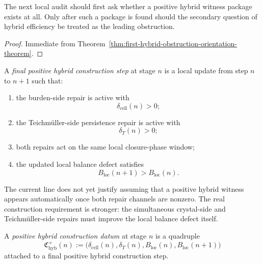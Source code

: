 \begin{corollary}
\label{cor:current-hybrid-balancing-obstruction-rule}
The next local audit should first ask whether a positive hybrid witness package exists at all. Only after such a package is found should the secondary question of hybrid efficiency be treated as the leading obstruction.
\end{corollary}

\begin{proof}
Immediate from Theorem~\ref{thm:first-hybrid-obstruction-orientation-theorem}.
\end{proof}




\begin{definition}
\label{def:final-positive-hybrid-construction-step}
A \emph{final positive hybrid construction step} at stage $n$ is a local update from step $n$ to $n+1$ such that:
\begin{enumerate}[leftmargin=2em,label=(\alph*)]
 \item the burden-side repair is active with
 \[
 \delta_{\mathrm{cell}}(n)>0;
 \]
 \item the Teichm\"uller-side persistence repair is active with
 \[
 \delta_T(n)>0;
 \]
 \item both repairs act on the same local closure-phase window;
 \item the updated local balance defect satisfies
 \[
 B_{\mathrm{loc}}(n+1)>B_{\mathrm{loc}}(n).
 \]
\end{enumerate}
\end{definition}

\begin{remark}
\label{rem:why-construction-phrased-this-way}
The current line does not yet justify assuming that a positive hybrid witness appears automatically once both repair channels are nonzero.
The real construction requirement is stronger: the simultaneous crystal-side and Teichm\"uller-side repairs must improve the local balance defect itself.
\end{remark}

\begin{definition}
\label{def:positive-hybrid-construction-datum}
A \emph{positive hybrid construction datum} at stage $n$ is a quadruple
\[
 \mathfrak C_{\mathrm{hyb}}^{+}(n)
 :=
 \bigl(
 \delta_{\mathrm{cell}}(n),
 \delta_T(n),
 B_{\mathrm{loc}}(n),
 B_{\mathrm{loc}}(n+1)
 \bigr)
\]
attached to a final positive hybrid construction step.
\end{definition}


